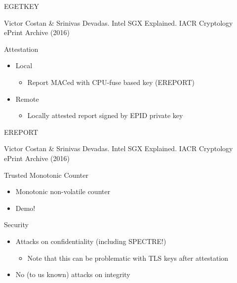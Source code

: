 \documentclass{beamer}
\begin{document}
	\begin{frame}{EGETKEY}
		

		\center\fontsize{4pt}{1}\selectfont
		Victor Costan \& Srinivas Devadas. Intel SGX Explained. IACR Cryptology ePrint Archive (2016)
	\end{frame}

	\begin{frame}{Attestation} %
		\begin{itemize}
			\item Local
				\begin{itemize}
					\item Report MACed with CPU-fuse based key (EREPORT)
				\end{itemize}
			\item Remote
				\begin{itemize}
					\item Locally attested report signed by EPID private key
				\end{itemize}
		\end{itemize}
	\end{frame}

	\begin{frame}{EREPORT}
		

		\center\fontsize{4pt}{1}\selectfont
		Victor Costan \& Srinivas Devadas. Intel SGX Explained. IACR Cryptology ePrint Archive (2016)
	\end{frame}

	\begin{frame}{Trusted Monotonic Counter} %
		\begin{itemize}
			\item Monotonic non-volatile counter
			\item Demo!
		\end{itemize}
	\end{frame}

	\begin{frame}{Security}	%
		\begin{itemize}
			\item Attacks on confidentiality (including SPECTRE!)
			\begin{itemize}
				\item Note that this can be problematic with TLS keys after attestation
			\end{itemize}
			\item No (to us known) attacks on integrity
		\end{itemize}
	\end{frame}
\end{document}
